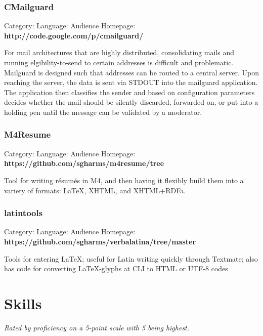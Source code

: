 \documentclass[]{article}
\begin{document}
\subsubsection*{CMailguard}
Category:  Language: Audience
Homepage: {\bf http://code.google.com/p/cmailguard/}
\vspace{0.05in}

For mail architectures that are highly distributed, consolidating mails and running elgibility-to-send to certain addresses is difficult and problematic.  Mailguard is designed such that addresses can be routed to a central server. Upon reaching the server, the data is sent via STDOUT into the mailguard application.  The application then classifies the sender and based on configuration parameters decides whether the mail should be silently discarded, forwarded on, or put into a holding pen until the message can be validated by a moderator.




\subsubsection*{M4Resume}
Category:  Language: Audience
Homepage: {\bf https://github.com/sgharms/m4resume/tree}
\vspace{0.05in}

Tool for writing résumés in M4, and then having it flexibly build them into a variety of formats:  \LaTeX, XHTML, and XHTML+RDFa.




\subsubsection*{latintools}
Category:  Language: Audience
Homepage: {\bf https://github.com/sgharms/verbalatina/tree/master}
\vspace{0.05in}

Tools for entering \LaTeX; useful for Latin writing quickly through Textmate; also has code for converting \LaTeX-glyphs at CLI to HTML or UTF-8 codes








\section*{Skills}



\emph{Rated by proficiency on a 5-point scale with 5 being highest.}
\end{document}
